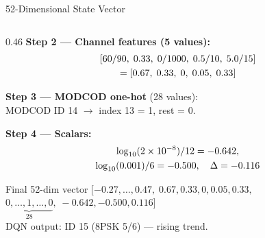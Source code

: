 \documentclass[aspectratio=169,10pt]{beamer}
\begin{document}
\begin{frame}[shrink=12]{52-Dimensional State Vector}
\begin{columns}[T]
\begin{column}{0.46\textwidth}
      \textbf{Step 2 — Channel features (5 values):}
      \begin{multline*}\scriptsize
        [60/90,\;0.33,\;0/1000,\;0.5/10,\;5.0/15]\\
        = [0.67,\;0.33,\;0,\;0.05,\;0.33]
      \end{multline*}

      \textbf{Step 3 — MODCOD one-hot} (28 values):\\
      MODCOD ID 14 $\to$ index 13 = 1, rest = 0.

      \textbf{Step 4 — Scalars:}
      \begin{multline*}\scriptsize
        \log_{10}(2\times10^{-8})/12=-0.642,\\
        \log_{10}(0.001)/6=-0.500,\quad\Delta=-0.116
      \end{multline*}

      \begin{resultbox}{Final 52-dim vector}
        \tiny $[-0.27,\ldots,0.47,\;0.67,0.33,0,0.05,0.33,$\\
        $\underbrace{0,\ldots,1,\ldots,0}_{28},\;-0.642,-0.500,0.116]$\\
        \scriptsize DQN output: ID 15 (8PSK 5/6) — rising trend.
      \end{resultbox}
    \end{column}
  \end{columns}
\end{frame}
\end{document}
